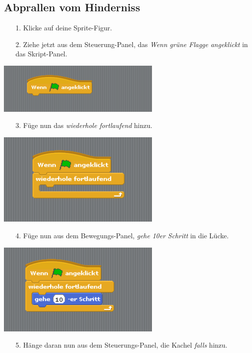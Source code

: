 \subsection{Abprallen vom Hinderniss}
\begin{itemize}
\item[1.] Klicke auf deine Sprite-Figur.
\item[2.] Ziehe jetzt aus dem Steuerung-Panel, das \textit{Wenn grüne Flagge angeklickt} in das Skript-Panel.
\end{itemize}
\includegraphics[width=0.6\textwidth]{images/aufgabe2_automat0.png}
\begin{itemize}
\item[3.] Füge nun das \textit{wiederhole fortlaufend} hinzu.
\end{itemize}
\includegraphics[width=0.6\textwidth]{images/aufgabe2_automat1.png}
\begin{itemize} 
\item[4.] Füge nun aus dem Bewegungs-Panel, \textit{gehe 10er Schritt} in die Lücke.
\end{itemize}
\includegraphics[width=0.6\textwidth]{images/aufgabe2_automat2.png}
\begin{itemize}
\item[5.] Hänge daran nun aus dem Steuerungs-Panel, die Kachel \textit{falls} hinzu.
\end{itemize}
